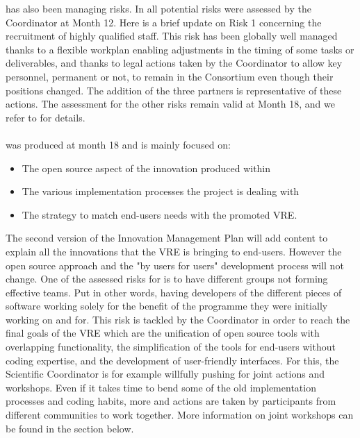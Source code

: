 \documentclass{deliverablereport}
\begin{document}
 has also been managing risks. In 
all potential risks were assessed by the Coordinator at Month 12. Here
is a brief update on Risk 1 concerning the recruitment of highly
qualified staff. This risk has been globally well managed thanks to a
flexible workplan enabling adjustments in the timing of some tasks or
deliverables, and thanks to legal actions taken by the Coordinator to
allow key personnel, permanent or not, to remain in the Consortium
even though their positions changed. The addition of the three
partners is representative of these actions. The assessment for the
other risks remain valid at Month 18, and we refer to
 for details.

\paragraph{}

 was produced at month 18 and is mainly focused on: 

\begin{itemize}
\item{The open source aspect of the innovation produced within \ODK}
\item{The various implementation processes the project is dealing with}
\item{The strategy to match end-users needs with the promoted VRE}.
\end{itemize}

  The second version of the Innovation Management Plan will add content to explain all the
  innovations that the VRE is bringing to end-users. However the open source approach and
  the "by users for users" development process will not change.  One
  of the assessed risks for \ODK is to have different groups not forming effective teams. Put
  in other words, having developers of the different pieces of software working solely for
  the benefit of the programme they were initially working on and for. This risk is
  tackled by the Coordinator in order to reach the final goals of the VRE which are the
  unification of open source tools with overlapping functionality, the simplification of
  the tools for end-users without coding expertise, and the development of user-friendly
  interfaces. For this, the Scientific Coordinator is for example willfully pushing
  for joint actions and
  workshops. Even if it takes time to bend some of the old implementation processes and coding habits,
  more and actions are taken by \ODK participants from different communities to work
  together. More information on joint workshops can be found in the section below.
\end{document}
